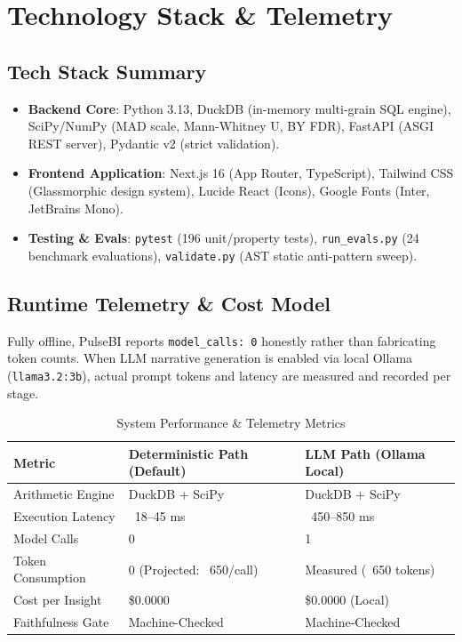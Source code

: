 \documentclass[11pt,a4paper]{article}
\begin{document}
\newpage

\section{Technology Stack \& Telemetry}

\subsection{Tech Stack Summary}
\begin{itemize}
    \item \textbf{Backend Core}: Python 3.13, DuckDB (in-memory multi-grain SQL engine), SciPy/NumPy (MAD scale, Mann-Whitney U, BY FDR), FastAPI (ASGI REST server), Pydantic v2 (strict validation).
    \item \textbf{Frontend Application}: Next.js 16 (App Router, TypeScript), Tailwind CSS (Glassmorphic design system), Lucide React (Icons), Google Fonts (Inter, JetBrains Mono).
    \item \textbf{Testing \& Evals}: \texttt{pytest} (196 unit/property tests), \texttt{run\_evals.py} (24 benchmark evaluations), \texttt{validate.py} (AST static anti-pattern sweep).
\end{itemize}

\subsection{Runtime Telemetry & Cost Model}
Fully offline, PulseBI reports \texttt{model\_calls: 0} honestly rather than fabricating token counts. When LLM narrative generation is enabled via local Ollama (\texttt{llama3.2:3b}), actual prompt tokens and latency are measured and recorded per stage.

\begin{table}[h!]
\centering
\caption{System Performance \& Telemetry Metrics}
\small
\begin{tabular}{lll}
\toprule
\textbf{Metric} & \textbf{Deterministic Path (Default)} & \textbf{LLM Path (Ollama Local)} \\
\midrule
Arithmetic Engine & DuckDB + SciPy & DuckDB + SciPy \\
Execution Latency & ~18--45 ms & ~450--850 ms \\
Model Calls & 0 & 1 \\
Token Consumption & 0 (Projected: ~650/call) & Measured (~650 tokens) \\
Cost per Insight & \$0.0000 & \$0.0000 (Local) \\
Faithfulness Gate & Machine-Checked & Machine-Checked \\
\bottomrule
\end{tabular}
\end{table}
\end{document}
